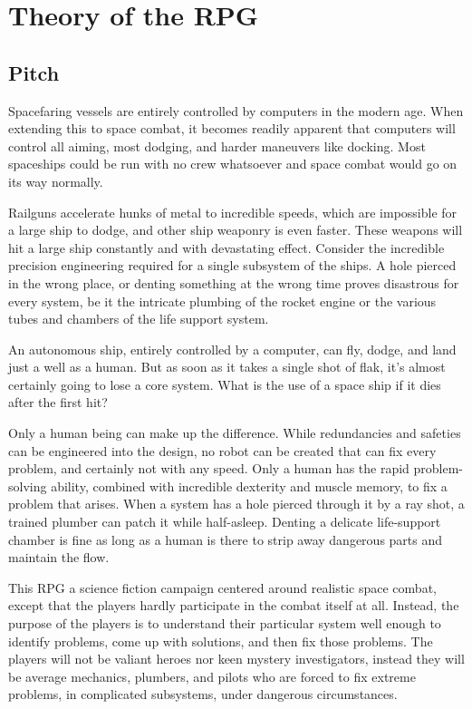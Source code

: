 \documentclass[a4paper]{article}
\begin{document}
\section{Theory of the RPG} \label{theory}

\subsection{Pitch}

Spacefaring vessels are entirely controlled by computers in the modern age. When extending this to space combat, it becomes readily apparent that computers will control all aiming, most dodging, and harder maneuvers like docking. Most spaceships could be run with no crew whatsoever and space combat would go on its way normally.

Railguns accelerate hunks of metal to incredible speeds, which are impossible for a large ship to dodge, and other ship weaponry is even faster. These weapons will hit a large ship constantly and with devastating effect. Consider the incredible precision engineering required for a single subsystem of the ships. A hole pierced in the wrong place, or denting something at the wrong time proves disastrous for every system, be it the intricate plumbing of the rocket engine or the various tubes and chambers of the life support system.

An autonomous ship, entirely controlled by a computer, can fly, dodge, and land just a well as a human. But as soon as it takes a single shot of flak, it's almost certainly going to lose a core system. What is the use of a space ship if it dies after the first hit?

Only a human being can make up the difference. While redundancies and safeties can be engineered into the design, no robot can be created that can fix every problem, and certainly not with any speed. Only a human has the rapid problem-solving ability, combined with incredible dexterity and muscle memory, to fix a problem that arises. When a system has a hole pierced through it by a ray shot, a trained plumber can patch it while half-asleep. Denting a delicate life-support chamber is fine as long as a human is there to strip away dangerous parts and maintain the flow.

This RPG a science fiction campaign centered around realistic space combat, except that the players hardly participate in the combat itself at all. Instead, the purpose of the players is to understand their particular system well enough to identify problems, come up with solutions, and then fix those problems. The players will not be valiant heroes nor keen mystery investigators, instead they will be average mechanics, plumbers, and pilots who are forced to fix extreme problems, in complicated subsystems, under dangerous circumstances. 
\end{document}
